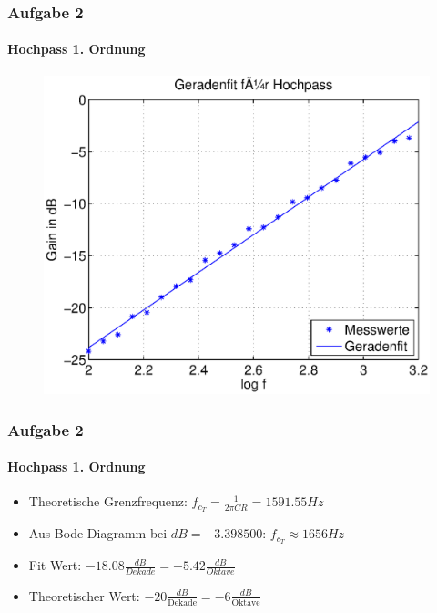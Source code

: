 \begin{frame}
    \frametitle{Aufgabe 2}
    \framesubtitle{Hochpass 1. Ordnung}
    \begin{figure}[H]
    \begin{center}
            \includegraphics[scale=0.6]{./img/2b_Fit.eps}
    \end{center}
    \end{figure}
\end{frame}
\begin{frame}
    \frametitle{Aufgabe 2}
    \framesubtitle{Hochpass 1. Ordnung}
     \begin{itemize}
        \item Theoretische Grenzfrequenz: $f_{c_T} = \frac{1}{2 \pi C
        R}=1591.55Hz$ 
        \item Aus Bode Diagramm bei $dB=-3.398500$: $f_{c_T} \approx 1656 Hz$
        \item Fit Wert: $-18.08 \frac{dB}{Dekade}= -5.42 \frac{dB}{Oktave}$
        \item Theoretischer Wert:
        $-20\frac{dB}{\text{Dekade}}=-6\frac{dB}{\text{Oktave}}$
     \end{itemize}
\end{frame}
